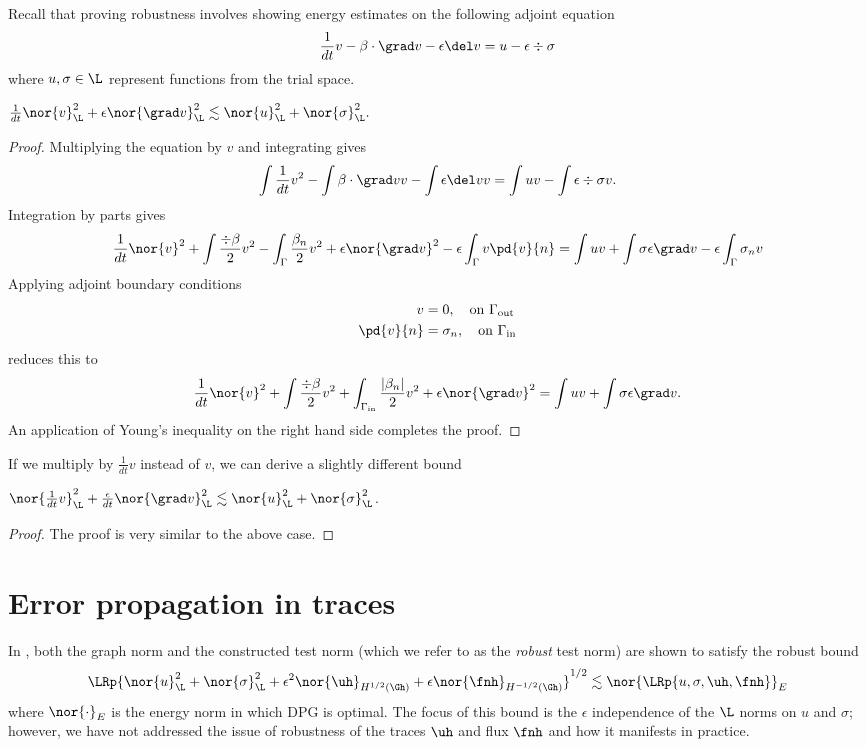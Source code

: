 Recall that proving robustness involves showing energy estimates on the following adjoint equation
\[
\frac{1}{dt}v - \beta\cdot \grad v - \epsilon\del v = u - \epsilon\div \sigma
\]
where $u, \sigma \in \L$ represent functions from the trial space.  
\begin{lemma}
$\frac{1}{dt}\nor{v}_{\L}^2 + \epsilon \nor{\grad v}_{\L}^2 \lesssim \nor{u}_{\L}^2 + \nor{\sigma}_{\L}^2.$
\end{lemma}
\begin{proof}
Multiplying the equation by $v$ and integrating gives
\[
\int \frac{1}{dt} v^2 - \int \beta \cdot \grad v v -  \int \epsilon \del v v = \int u v -  \int \epsilon \div \sigma v.
\]
Integration by parts gives
\[
\frac{1}{dt} \nor{v}^2 + \int \frac{\div \beta}{2} v^2 - \int_\Gamma \frac{\beta_n}{2}v^2 + \epsilon \nor{\grad v}^2 - \epsilon \int_\Gamma v\pd{v}{n}  = \int uv + \int \sigma \epsilon \grad v  - \epsilon \int_\Gamma \sigma_n v
\]
Applying adjoint boundary conditions 
\begin{align*}
v &= 0, \quad \text{on } \Gamma_{\rm out}\\
\pd{v}{n} &= \sigma_n, \quad \text{on } \Gamma_{\rm in}
\end{align*}
reduces this to
\[
\frac{1}{dt} \nor{v}^2 + \int \frac{\div \beta}{2} v^2 + \int_{\Gamma_{\rm in}} \frac{|\beta_n|}{2}v^2 + \epsilon \nor{\grad v}^2 = \int uv + \int \sigma \epsilon \grad v.
\]
An application of Young's inequality on the right hand side completes the proof.  
\end{proof}
If we multiply by $\frac{1}{dt}v$ instead of $v$, we can derive a slightly different bound
\begin{lemma}
$\nor{\frac{1}{dt}v}_{\L}^2 + \frac{\epsilon}{dt} \nor{\grad v}_{\L}^2 \lesssim \nor{u}_{\L}^2 + \nor{\sigma}_{\L}^2$.
\end{lemma}
\begin{proof}
The proof is very similar to the above case. 
\end{proof}
\section{Error propagation in traces}

In \cite{DPGrobustness}, both the graph norm and the constructed test norm (which we refer to as the \textit{robust} test norm) are shown to satisfy the robust bound
\[
\LRp{\nor{u}_{\L}^2 + \nor{\sigma}_{\L}^2 + \epsilon^2\nor{\uh}_{H^{1/2}(\Gh)} + \epsilon\nor{\fnh}_{H^{-1/2}(\Gh)}}^{1/2} \lesssim \nor{\LRp{u,\sigma,\uh,\fnh}}_E
\]
where $\nor{\cdot}_E$ is the energy norm in which DPG is optimal.  The focus of this bound is the $\epsilon$ independence of the $\L$ norms on $u$ and $\sigma$; however, we have not addressed the issue of robustness of the traces $\uh$ and flux $\fnh$ and how it manifests in practice.  

